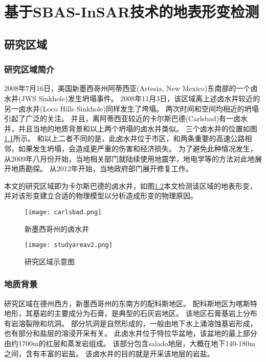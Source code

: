 \chapter{基于SBAS-InSAR技术的地表形变检测}

\section{研究区域}

\subsection{研究区域简介}
2008年7月16日，美国新墨西哥州阿蒂西亚(Artesia, New Mexico)东南部的一个卤水井(JWS Sinkhole)发生坍塌事件。
2008年11月3日，该区域离上述卤水井较近的另一卤水井(Loco Hills Sinkhole)同样发生了垮塌。
两次时间和空间均相近的坍塌引起了广泛的关注。
并且，离阿蒂西亚较近的卡尔斯巴德(Carlsbad)有一卤水井，并且当地的地质背景和以上两个坍塌的卤水井类似。
三个卤水井的位置如图\ref{fig:carlsbad}所示。
和以上二者不同的是，此卤水井位于市区，和两条重要的高速公路相邻，如果发生坍塌，会造成更严重的伤害和经济损失。
为了避免此种情况发生，从2009年八月份开始，当地相关部门就陆续使用地震学，地电学等的方法对此地展开地质勘探。
从2012年开始，当地政府部门展开修复工作。

本文的研究区域即为卡尔斯巴德的卤水井，如图\ref{fig:studyarea}本文检测该区域的地表形变，
并对该形变建立合适的物理模型以分析造成形变的物理原因。
\begin{figure}[htb]
  \centering
  \texttt{[image: carlsbad.png]}
  \caption{新墨西哥州的卤水井}
  \label{fig:carlsbad}
\end{figure}
\begin{figure}[htb]
    \centering
    \texttt{[image: studyareav2.png]}
    \caption{研究区域示意图}
    \label{fig:studyarea}
\end{figure}
\subsection{地质背景}
研究区域在德州西方，新墨西哥州的东南方的配科斯地区。
配科斯地区为喀斯特地形，其基岩的主要成分为石膏，是典型的石灰岩地区。
该地区石膏基岩上分布有岩溶裂隙和坑洞。
部分坑洞是自然形成的，一般由地下水上涌溶蚀基岩形成，也有部分和盐层的溶浸开采有关。
此卤水井位于特拉华盆地，该盆地的最上部分由约1700m的红层和蒸发岩组成。
该部分包含salado地层，大概在地下140-180m之间，含有丰富的岩盐。
该卤水井的目的就是开采该地层的岩盐。

